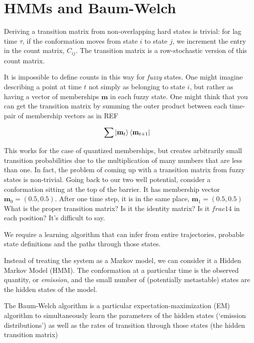 \documentclass[10pt]{article}
\begin{document}
\section{HMMs and Baum-Welch}

Deriving a transition matrix from non-overlapping hard states is trivial: for lag time
$\tau$, if the conformation moves from state $i$ to state $j$, we increment the entry
in the count matrix, $C_{ij}$. The transition matrix is a row-stochastic version of
this count matrix.

It is impossible to define counts in this way for \textit{fuzzy} states. One might
imagine describing a point at time $t$ not simply as belonging to state $i$, but rather as 
having a vector of memberships $\mathbf{m}$ in each fuzzy state. One might think
that you can get the transition matrix by summing the outer product between each
time-pair of membership vectors as in REF

\begin{equation}
\sum \Ket{\mathbf{m}_t} \Bra{\mathbf{m}_{t+1}}
\end{equation}

This works for the case of quantized memberships, but creates
arbitrarily small transition probabilities due to the multiplication
of many numbers that are less than one. In fact, the problem
of coming up with a transition matrix from fuzzy states is non-trivial.
Going back to our two well potential, consider a conformation sitting at
the top of the barrier. It has membership vector $\mathbf{m}_0 = (0.5,0.5)$. 
After one time step, it is in the same place, $\mathbf{m}_1 =(0.5, 0.5)$
What is the proper transition matrix? Is it the identity matrix? Is it
$frac{1}{4}$ in each position? It's difficult to say.

We require a learning algorithm that can infer from entire trajectories, probable
state definitions and the paths through those states.


Instead of treating the system as a Markov model, we can consider it a Hidden
Markov Model (HMM). The conformation
at a particular time is the observed quantity, or \textit{emission}, and the small number of
(potentially metastable) states
are the hidden states of the model. 

The Baum-Welch algorithm is a particular expectation-maximization (EM) algorithm to simultaneously
learn the parameters of the hidden states (`emission distributions') as well as the rates of transition
through those states (the hidden transition matrix)
\end{document}
